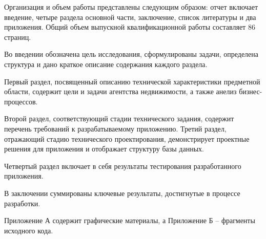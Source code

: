 Организация и объем работы представлены следующим образом: отчет включает введение, четыре раздела основной части, заключение, список литературы и два приложения. Общий объем выпускной квалификационной работы составляет 86 страниц.

Во введении обозначена цель исследования, сформулированы задачи, определена структура и дано краткое описание содержания каждого раздела.

Первый раздел, посвященный описанию технической характеристики предметной области, содержит цели и задачи агентства недвижимости, а также анелиз бизнес-процессов.

Второй раздел, соответствующий стадии технического задания, содержит перечень требований к разрабатываемому приложению.
Третий раздел, отражающий стадию технического проектирования, демонстрирует проектные решения для приложения и отображает структуру базы данных.

Четвертый раздел включает в себя результаты тестирования разработанного приложения.

В заключении суммированы ключевые результаты, достигнутые в процессе разработки.

Приложение А содержит графические материалы, а Приложение Б – фрагменты исходного кода.

